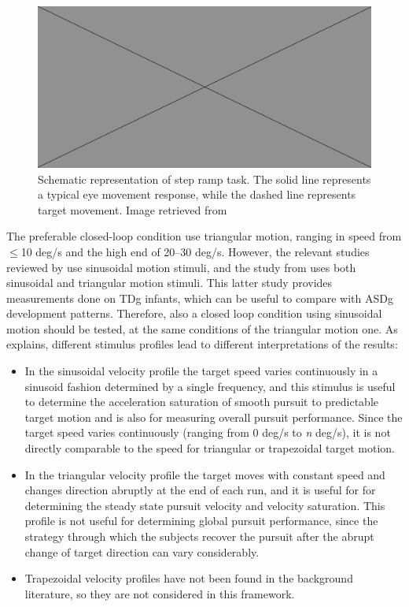 \begin{figure}[h]
  \centering
  \includegraphics[width=.5\textwidth]{figures/placeholderImg.jpg}
  \caption[pursuit measurements ASDg]{Schematic representation of step ramp task. The solid line represents a typical eye movement response, while the dashed line represents target movement. Image retrieved from \cite{takarae2004smoothpursuit}}
  \label{fig:steprampscheme}
\end{figure}

The preferable closed-loop condition use triangular motion, ranging in speed from \(\leq\)10 deg/s and the high end of 20–30 deg/s. However, the relevant studies reviewed by \cite{johnson2016review} use sinusoidal motion stimuli, and the study from \cite{vonhofsten1997smoothpursuit} uses both sinusoidal and triangular motion stimuli. This latter study provides measurements done on TDg infants, which can be useful to compare with ASDg development patterns. Therefore, also a closed loop condition using sinusoidal motion should be tested, at the same conditions of the triangular motion one. As \cite{smyrnis2008guidelines} explains, different stimulus profiles lead to different interpretations of the results:
\begin{itemize}
    \item In the sinusoidal velocity profile the target speed varies continuously in a sinusoid fashion determined by a single frequency, and this stimulus is useful to determine the acceleration saturation of smooth pursuit to predictable target motion and is also for measuring overall pursuit performance. Since the target speed varies continuously (ranging from 0 deg/s to \textit{n} deg/s), it is not directly comparable to the speed for triangular or trapezoidal target motion.
    \item In the triangular velocity profile the target moves with constant speed and changes direction abruptly at the end of each run, and it is useful for for determining the steady state pursuit velocity and velocity saturation. This profile is not useful for determining global pursuit performance, since the strategy through which the subjects recover the pursuit after the abrupt change of target direction can vary considerably.
    \item Trapezoidal velocity profiles have not been found in the background literature, so they are not considered in this framework.
\end{itemize}

